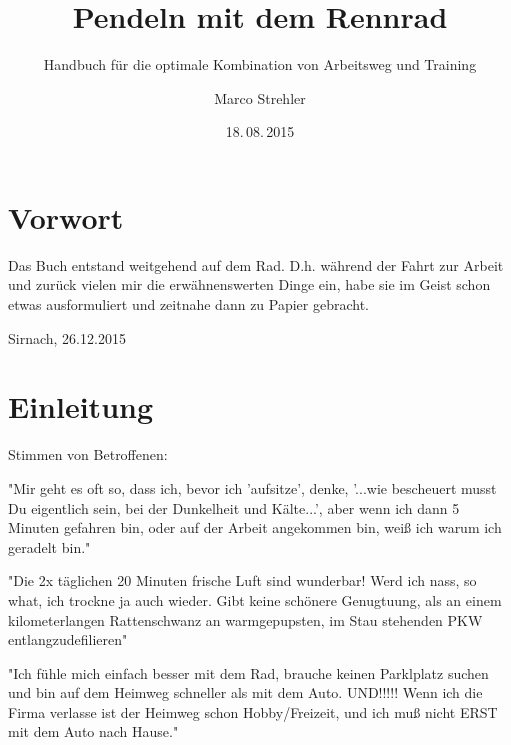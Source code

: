 \documentclass[a4paper,DIV13,BCOR1cm]{scrbook}
\begin{document}

\title{Pendeln mit dem Rennrad}
\subtitle{Handbuch für die optimale Kombination von Arbeitsweg und Training}  
\author{Marco Strehler}
\date{18.\,08.\,2015}
\dedication{Harden The Fuck Up.\\
        Velominati, Rule \#5}
\frontmatter
\maketitle

\chapter{Vorwort}

Das Buch entstand weitgehend auf dem Rad.
D.h. während der Fahrt zur Arbeit und zurück vielen mir die erwähnenswerten Dinge ein, habe sie im Geist schon etwas ausformuliert und zeitnahe dann zu Papier gebracht.

Sirnach, 26.12.2015

\tableofcontents

\mainmatter

\chapter{Einleitung}


Stimmen von Betroffenen:

"Mir geht es oft so, dass ich, bevor ich 'aufsitze', denke,
'...wie bescheuert musst Du eigentlich sein, bei der Dunkelheit und Kälte...',
aber wenn ich dann 5 Minuten gefahren bin, oder auf der Arbeit angekommen bin,
weiß ich warum ich geradelt bin."
\cite{iglimann2011rennradnews}

"Die 2x täglichen 20 Minuten frische Luft sind wunderbar!
Werd ich nass, so what, ich trockne ja auch wieder.
Gibt keine schönere Genugtuung, als an einem kilometerlangen Rattenschwanz an warmgepupsten, im Stau stehenden PKW entlangzudefilieren"
\cite{efix2011rennradnews}


"Ich fühle mich einfach besser mit dem Rad, brauche keinen Parklplatz suchen und bin auf dem Heimweg schneller als mit dem Auto.
UND!!!!! Wenn ich die Firma verlasse ist der Heimweg schon Hobby/Freizeit,
und ich muß nicht ERST mit dem Auto nach Hause."
\cite{littlechex2011rennradnews}
\end{document}
